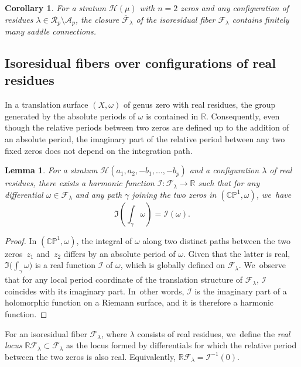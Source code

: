 \documentclass[JEP,XML,SOM,Unicode,NoFloatCountersInSection,published]{cedram}
\newtheorem{cor}[thm]{Corollary}
\newtheorem{lem}[thm]{Lemma}
\theoremstyle{definition}
\begin{document}
\begin{cor}\label{cor:SCFinite}
For a stratum $\mathcal{H}(\mu)$ with $n=2$ zeros and any configuration of residues $\lambda \in \mathcal{R}_{p} \setminus \mathcal{A}_{p}$, the closure $\overline{\mathcal{F}}_{\lambda}$ of the isoresidual fiber $\mathcal{F}_{\lambda}$ contains finitely many saddle connections.
\end{cor}

\subsection{Isoresidual fibers over configurations of real residues}\label{sub:FiberReal}

In a translation surface $(X,\omega)$ of genus zero with real residues, the group generated by the absolute periods of $\omega$ is contained in $\mathbb{R}$. Consequently, even though the relative periods between two zeros are defined up to the addition of an absolute period, the imaginary part of the relative period between any two fixed zeros does not depend on the integration path.

\begin{lem}\label{lem:Imaginary}
For a stratum $\mathcal{H}(a_{1},a_{2},-b_{1},\dots,-b_{p})$ and a configuration $\lambda$ of real residues, there exists a harmonic function $\mathcal{I}\colon\mathcal{F}_{\lambda} \to \mathbb{R}$ such that for any differential $\omega \in \mathcal{F}_{\lambda}$ and any path $\gamma$ joining the two zeros in $(\mathbb{CP}^{1},\omega)$, we~have
\[
\Im \left( \int_{\gamma} \omega \right) = \mathcal{I}(\omega).
\]
\end{lem}

\begin{proof}
In $(\mathbb{CP}^{1},\omega)$, the integral of $\omega$ along two distinct paths between the two zeros~$z_{1}$ and~$z_{2}$ differs by an absolute period of $\omega$. Given that the latter is real, $\Im\big(\int_{\gamma} \omega\big)$ is a real function $\mathcal{I}$ of $\omega$, which is globally defined on $\mathcal F_\lambda$. We~observe that for any local period coordinate of the translation structure of $\mathcal{F}_{\lambda}$, $\mathcal{I}$ coincides with its imaginary part. In~other words, $\mathcal{I}$ is the imaginary part of a holomorphic function on a Riemann surface, and it is therefore a harmonic function.
\end{proof}

For an isoresidual fiber $\mathcal{F}_{\lambda}$, where $\lambda$ consists of real residues, we~define the \textit{real locus} $\mathbb{R}\mathcal{F}_{\lambda} \subset \mathcal{F}_{\lambda}$ as the locus formed by differentials for which the relative period between the two zeros is also real. Equivalently, $\mathbb{R}\mathcal{F}_{\lambda} = \mathcal{I}^{-1}(0)$.
\end{document}
